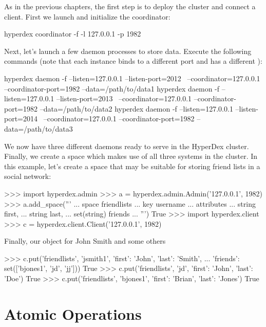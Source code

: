 As in the previous chapters, the first step is to deploy the cluster and connect
a client.   First we launch and initialize the coordinator:

\begin{consolecode}
hyperdex coordinator -f -l 127.0.0.1 -p 1982
\end{consolecode}

Next, let's launch a few daemon processes to store data.  Execute the following
commands (note that each instance binds to a different port and has a different
):

\begin{consolecode}
hyperdex daemon -f --listen=127.0.0.1 --listen-port=2012 \
                   --coordinator=127.0.0.1 --coordinator-port=1982 --data=/path/to/data1
hyperdex daemon -f --listen=127.0.0.1 --listen-port=2013 \
                   --coordinator=127.0.0.1 --coordinator-port=1982 --data=/path/to/data2
hyperdex daemon -f --listen=127.0.0.1 --listen-port=2014 \
                   --coordinator=127.0.0.1 --coordinator-port=1982 --data=/path/to/data3
\end{consolecode}

We now have three different daemons ready to serve in the HyperDex cluster.
Finally, we create a space which makes use of all three systems in the cluster.
In this example, let's create a space that may be suitable for storing friend
lists in a social network:

\begin{pythoncode}
>>> import hyperdex.admin
>>> a = hyperdex.admin.Admin('127.0.0.1', 1982)
>>> a.add_space('''
... space friendlists
... key username
... attributes
...    string first,
...    string last,
...    set(string) friends
... ''')
True
>>> import hyperdex.client
>>> c = hyperdex.client.Client('127.0.0.1', 1982)
\end{pythoncode}

Finally, our object for John Smith and some others

\begin{pythoncode}
>>> c.put('friendlists', 'jsmith1', {'first': 'John', 'last': 'Smith',
...                                  'friends': set(['bjones1', 'jd', 'jj'])})
True
>>> c.put('friendlists', 'jd', {'first': 'John', 'last': 'Doe'})
True
>>> c.put('friendlists', 'bjones1', {'first': 'Brian', 'last': 'Jones'})
True
\end{pythoncode}

\section{Atomic Operations}
\label{sec:atomic-ops:ops}

